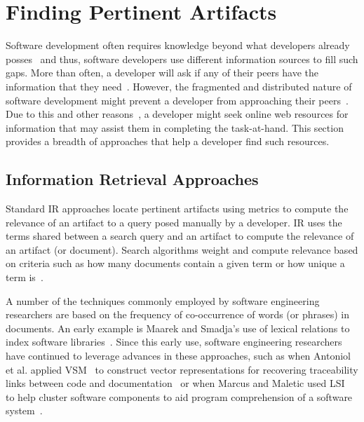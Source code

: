 \section{Finding Pertinent Artifacts}
\label{cp2:foraging-tools}



Software development often requires knowledge beyond what developers already posses~\cite{Li2013} and thus, 
software developers use different information sources to fill such gaps. 
More than often, a developer will ask if any of their 
peers have the information that they need~\cite{singer2011}. 
However, the fragmented and distributed nature of software development  
might prevent a developer from approaching their peers~\cite{ko2007}.
Due to this and other reasons~\cite{Xia2017, rao2020}, a developer might seek
online web resources for information 
that may assist them in completing the task-at-hand.
This section provides a breadth of approaches that help a developer find such resources.




\subsection{Information Retrieval Approaches} 
\label{cp2:ir-approaches}





Standard \acf{IR} approaches locate pertinent artifacts
using metrics to compute the relevance of an artifact to a query posed manually by a developer.
\acs{IR} uses the terms shared between a search query and an artifact
to compute the relevance of an artifact (or document).
Search algorithms weight and compute relevance based on 
criteria such as how many documents contain a given term or  
how unique a term is~\cite{Manning2009IR}.



A number of the techniques commonly employed by software engineering researchers are based on the
frequency of co-occurrence of words (or phrases) in documents.
An early example is Maarek and Smadja's use of lexical relations to index
software libraries~\cite{maarek1989}.
Since this early use, software engineering
researchers have continued to leverage advances in
these approaches, such as when
Antoniol et al. applied \acf{VSM}~\cite{Salton1975vsm} 
to construct vector representations 
for recovering traceability links 
between code and documentation~\cite{antoniol1999, antoniol2000}
or when Marcus and Maletic used \acf{LSI}~\cite{deerwester1990LSI}
to help cluster software components to aid
program comprehension of a software system~\cite{marcus2003}.



